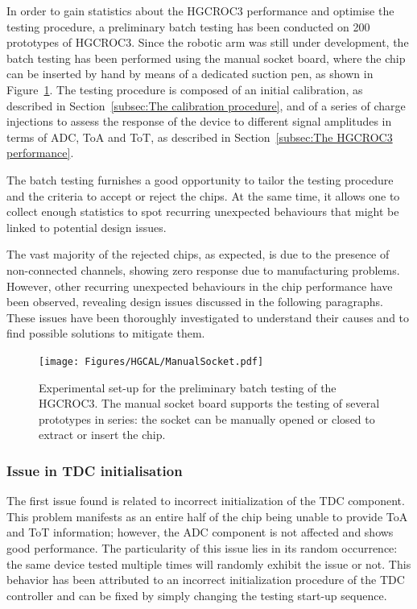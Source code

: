 In order to gain statistics about the HGCROC3 performance and optimise the testing procedure, a preliminary batch testing has been conducted on 200 prototypes of HGCROC3. Since the robotic arm was still under development, the batch testing has been performed using the manual socket board, where the chip can be inserted by hand by means of a dedicated suction pen, as shown in Figure~\ref{fig:ManualSocket}.
The testing procedure is composed of an initial calibration, as described in Section~\ref{subsec:The calibration procedure}, and of a series of charge injections to assess the response of the device to different signal amplitudes in terms of ADC, ToA and ToT, as described in Section~\ref{subsec:The HGCROC3 performance}.

\bigbreak

The batch testing furnishes a good opportunity to tailor the testing procedure and the criteria to accept or reject the chips. At the same time, it allows one to collect enough statistics to spot recurring unexpected behaviours that might be linked to potential design issues.

The vast majority of the rejected chips, as expected, is due to the presence of non-connected channels, showing zero response due to manufacturing problems. 
However, other recurring unexpected behaviours in the chip performance have been observed, revealing design issues discussed in the following paragraphs. These issues have been thoroughly investigated to understand their causes and to find possible solutions to mitigate them.

\begin{figure}
    \centering
    \texttt{[image: Figures/HGCAL/ManualSocket.pdf]}
    \caption{Experimental set-up for the preliminary batch testing of the HGCROC3. The manual socket board supports the testing of several prototypes in series: the socket can be manually opened or closed to extract or insert the chip.}
    \label{fig:ManualSocket}
\end{figure}

\subsubsection{Issue in TDC initialisation}
\label{subsubsec:Issue in TDC initialisation}

The first issue found is related to incorrect initialization of the TDC component. This problem manifests as an entire half of the chip being unable to provide ToA and ToT information; however, the ADC component is not affected and shows good performance. The particularity of this issue lies in its random occurrence: the same device tested multiple times will randomly exhibit the issue or not. This behavior has been attributed to an incorrect initialization procedure of the TDC controller and can be fixed by simply changing the testing start-up sequence.

